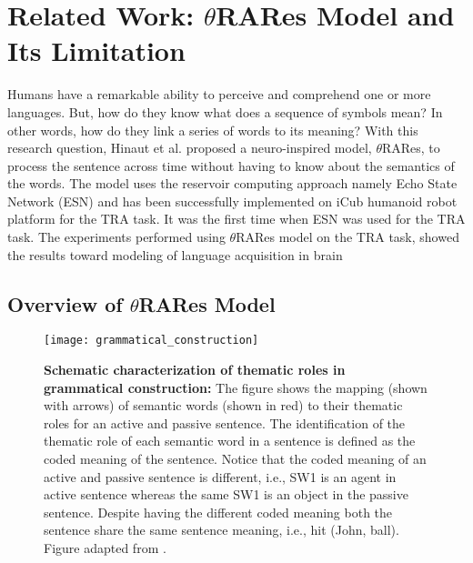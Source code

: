 \chapter{Related Work: $\theta$RARes Model and Its Limitation}\label{issues}

Humans have a remarkable ability to perceive and comprehend one or more languages. But, how do they know what does a sequence of symbols mean? In other words, how do they link a series of words to its meaning? With this research question, Hinaut et al. \cite{xavier:2013:RT} proposed a neuro-inspired model, $\theta$RARes, to process the sentence across time without having to know about the semantics of the words. The model uses the reservoir computing approach namely Echo State Network (ESN) and has been successfully implemented on iCub humanoid robot platform \cite{tra:xavier_hri} for the TRA task. It was the first time when ESN was used for the TRA task. The experiments performed using $\theta$RARes model on the TRA task, showed the results toward modeling of language acquisition in brain \cite{tra:xavier_wermter:2014, xavier:2013:RT}

\section{Overview of $\theta$RARes Model}\label{sec:xavier_model}

\begin{figure}[hbtp]
\centering
\texttt{[image: grammatical\_construction]}
\caption[Schematic characterization of TRA in grammatical construction.]{\textbf{Schematic characterization of thematic roles in grammatical construction:} {\small The figure shows the mapping (shown with arrows) of semantic words (shown in red) to their thematic roles for an active and passive sentence. The identification of the thematic role of each semantic word in a sentence is defined as the coded meaning of the sentence. Notice that the coded meaning of an active and passive sentence is different, i.e., SW1 is an agent in active sentence whereas the same SW1 is an object in the passive sentence. Despite having the different coded meaning both the sentence share the same sentence meaning, i.e., hit (John, ball). Figure adapted from \cite{xavier:2013:RT}.}} 
\label{fig:tra_gc}
\end{figure}

